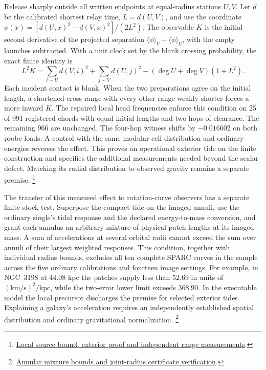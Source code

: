\documentclass[11pt]{article}
\begin{document}
Release sharply outside all written endpoints at equal-radius
stations \(U,V\). Let \(d\) be the calibrated shortest relay time,
\(L=d(U,V)\), and use the coordinate
\(\phi(x)=[d(U,x)^2-d(V,x)^2]/(2L^2)\).
The observable \(K\) is the initial second derivative of the projected
separation \(\langle\phi\rangle_V-\langle\phi\rangle_U\),
with the empty launches subtracted. With a unit clock set by the
blank crossing probability, the exact finite identity is
\[
L^2 K=\sum_{i\sim U}d(V,i)^2+\sum_{j\sim V}d(U,j)^2
       -(\deg U+\deg V)(1+L^2).
\]
Each incident contact is blank. When the two preparations agree on
the initial length, a shortened cross-range with every other range
weakly shorter forces a more inward \(K\). The repaired local head
frequencies enforce this condition on 25 of 991 registered chords
with equal initial lengths and two hops of clearance. The remaining
966 are unchanged. The four-hop witness shifts by \(-0.016602\) on
both probe loads. A control with the same modular-cell distribution
and ordinary energies reverses the effect. This proves an operational
exterior tide on the finite construction and specifies the additional
measurements needed beyond the scalar defect. Matching its radial
distribution to observed gravity remains a separate premise.%
\footnote{\href{https://github.com/FloatingPragma/observer-patch-holography/blob/main/model/experiments/interval_echo_shell_flux/product_address/green_response/material_recoil/overlap_source/native_boundary/stock/aperture/TIDAL_RESULTS.md}{Local source bound, exterior proof and independent range measurements}.}

The transfer of this measured effect to rotation-curve observers has a
separate finite-stock test. Superpose the compact tide on the imaged
annuli, use the ordinary single's tidal response and the declared
energy-to-mass conversion, and grant each annulus an arbitrary mixture
of physical patch lengths at its imaged mass. A sum of accelerations at
several orbital radii cannot exceed the sum over annuli of their largest
weighted responses. This condition, together with individual radius
bounds, excludes all ten complete SPARC curves in the sample across the
five ordinary calibrations and fourteen image settings. For example, in
NGC~3198 at 44.08 kpc the patches supply less than \(52.69\) in units of
\((\mathrm{km/s})^2/\mathrm{kpc}\), while the two-error lower limit
exceeds \(368.90\). In the executable model the local precursor
discharges the premise for selected exterior tides. Explaining a
galaxy's acceleration requires an independently established spatial
distribution and ordinary gravitational normalization.%
\footnote{\href{https://github.com/FloatingPragma/observer-patch-holography/blob/main/code/cosmology/paid_trail_bao/tidal_mixture.py}{Annular mixture bounds and joint-radius certificate verification}.}
\end{document}
